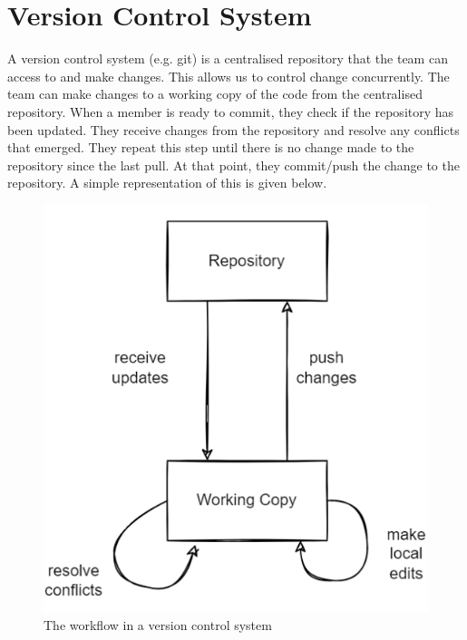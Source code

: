 \documentclass[a4paper, openany]{memoir}
\begin{document}
\section{Version Control System}
A version control system (e.g. git) is a centralised repository that the team can access to and make changes. This allows us to control change concurrently. The team can make changes to a working copy of the code from the centralised repository. When a member is ready to commit, they check if the repository has been updated. They receive changes from the repository and resolve any conflicts that emerged. They repeat this step until there is no change made to the repository since the last pull. At that point, they commit/push the change to the repository. A simple representation of this is given below.
\begin{figure}[H]
    \centering
    \includegraphics[scale=0.6]{src/3.5 VCS.png}
    \caption{The workflow in a version control system}
\end{figure}
\end{document}
